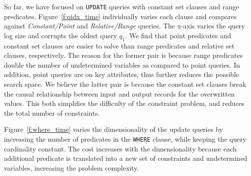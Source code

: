 So far, we have focused on \texttt{UPDATE} queries with constant set clauses and range predicates.  
Figure~\ref{f:qidx_time} individually varies each clause and compares against {\it Constant/Point} and {\it Relative/Range} queries. 
The x-axis varies the query log size and corrupts the oldest query $q_1$. 
We find that point predicates and constant set clauses are easier to solve than range predicates and relative set clauses, respectively.
The reason for the former pair is because range predicates double the number of undetermined variables as compared to point queries.  
In addition, point queries are on key attributes, thus further reduces the possible search space.  
We believe the latter pair is because the constant set clauses break the causal relationship between input and output records for the overwritten values.
This both simplifies the difficulty of the constraint problem, and reduces the total number of constraints.


Figure~\ref{f:where_time} varies the dimensionality of the update queries by increasing the number of predicates in the \texttt{WHERE} clause, while keeping the query cardinality constant.
The cost increases with the dimensionality because each additional predicate is translated into a new set of constraints and undetermined variables, increasing the problem complexity.



